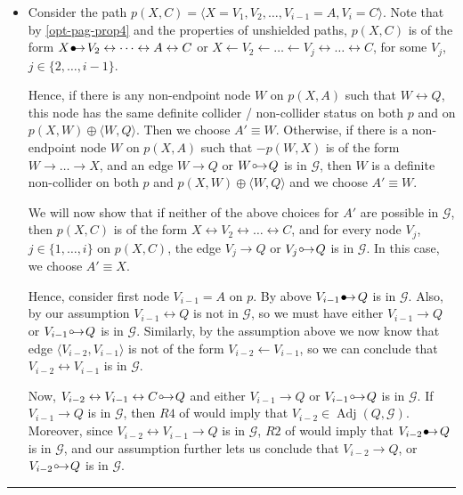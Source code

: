 \documentclass[twoside]{article}
\DeclareMathOperator{\Adj}{Adj}
\newcommand{\g}[1][G]{\mathcal{#1}}
\newenvironment{proofof}[1][]{\begin{trivlist}
\item[\hskip \labelsep {\bfseries Proof of #1.}]}{\hfill\BlackBox\end{trivlist}}
\newcommand{\BlackBox}{\rule{1.5ex}{1.5ex}}
\newcommand{\bulletarrow}{
  \setlength{\unitlength}{1mm}
  \begin{picture}(5,1)(0,0)
    \put(0.2,0){$\bullet$}
    \put(1,0){$\rightarrow$}
  \end{picture}
}
\newcommand{\circarrow}{
  \setlength{\unitlength}{1mm}
  \begin{picture}(5,1)(0,0)
    \put(1,1){\circle{1}}
    \put(1.2,0){$\rightarrow$}
  \end{picture}
}
\begin{document}
\begin{proofof}[Lemma \ref{lem:adjust-and-o-pag-helper}]
    \begin{itemize}
        \item Consider the path $p(X,C) = \langle X = V_1, V_2, \dots, V_{i-1} = A, V_i = C \rangle $. Note that by \ref{opt-pag-prop4} and the properties of unshielded paths, $p(X,C)$ is of the form $X \bulletarrow V_2 \leftrightarrow \dots \leftrightarrow A \leftrightarrow C$ or $X \leftarrow V_2 \leftarrow \dots \leftarrow V_j \leftrightarrow \dots \leftrightarrow C$, for some $V_j$, $j \in \{2, \dots, i-1\}$. 
        
        Hence, if there is any non-endpoint node $W$ on $p(X,A)$ such that $W \leftrightarrow Q$, this node has the same definite collider / non-collider status on both $p$ and on $p(X,W) \oplus \langle W, Q \rangle$. Then we choose $A' \equiv W$. Otherwise, if there is a non-endpoint node $W$ on $p(X,A)$ such that $-p(W, X)$ is of the form $W \to \dots \to X$, and an edge $W \to Q$ or $W \circarrow Q$ is in $\g$, then $W$ is a definite non-collider on both $p$ and $p(X,W) \oplus \langle W, Q \rangle$ and we choose $A' \equiv W$.

        We will now show that if neither of the above choices for $A'$ are possible in $\g$, then $p(X,C)$ is of the form $X \leftrightarrow V_2 \leftrightarrow \dots \leftrightarrow C$, and for every node $V_j$, $j \in \{1, \dots, i\}$ on $p(X,C)$, the edge $V_j \to Q$ or $V_j \circarrow Q$ is in $\g$. In this case, we choose $A' \equiv X$.
        
        Hence, consider first node $V_{i-1} = A$ on $p$. By above $V_{i-1} \bulletarrow Q$ is in $\g$. Also, by our assumption  $V_{i-1} \leftrightarrow Q$ is not in $\g$, so we must have either $V_{i-1} \to Q$ or $V_{i-1} \circarrow Q$ is in $\g$. Similarly, by the assumption above we now know that edge $\langle V_{i-2}, V_{i-1} \rangle$ is not of the form $V_{i-2} \leftarrow V_{i-1}$, so we can conclude that $V_{i-2} \leftrightarrow V_{i-1}$ is in $\g$. 
        
        Now, $V_{i-2} \leftrightarrow V_{i-1} \leftrightarrow C \circarrow Q$ and either $V_{i-1} \to Q$ or $V_{i-1} \circarrow Q$ is in $\g$. If $V_{i-1} \to Q$ is in $\g$, then $R4$ of \cite{zhang2008completeness} would imply that $V_{i-2} \in \Adj(Q, \g)$. Moreover, since $V_{i-2} \leftrightarrow V_{i-1} \to Q$ is in $\g$, $R2$ of \cite{zhang2008completeness} would imply that $V_{i-2} \bulletarrow Q$ is in $\g$, and our assumption further lets us conclude that $V_{i-2} \to Q$, or $V_{i-2} \circarrow Q$ is in $\g.$
        

\end{itemize}
\end{proofof}
\end{document}
